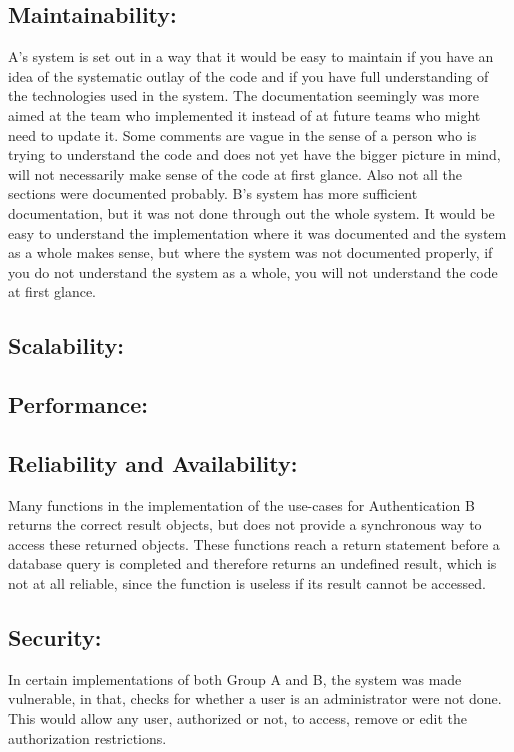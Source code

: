 \subsection{Maintainability:}
A's system is set out in a way that it would be easy to maintain if you have an idea of the systematic outlay of the code and if you have full understanding of the technologies used in the system. The documentation seemingly was more aimed at the team who implemented it instead of at future teams who might need to update it. Some comments are vague in the sense of a person who is trying to understand the code and does not yet have the bigger picture in mind, will not necessarily make sense of the code at first glance. Also not all the sections were documented probably.
B's system has more sufficient documentation, but it was not done through out the whole system. It would be easy to understand the implementation where it was documented and the system as a whole makes sense, but where the system was not documented properly, if you do not understand the system as a whole, you will not understand the code at first glance. 

\subsection{Scalability:}

\subsection{Performance:}

\subsection{Reliability and Availability:}
Many functions in the implementation of the use-cases for Authentication B returns the correct result objects, but does not provide a synchronous way to access these returned objects. These functions reach a return statement before a database query is completed and therefore returns an undefined result, which is not at all reliable, since the function is useless if its result cannot be accessed.

\subsection{Security:}
In certain implementations of both  Group A and B, the system was made vulnerable, in that, checks for whether a user is an administrator were not done. This would allow any user, authorized or not, to access, remove or edit the authorization restrictions.


